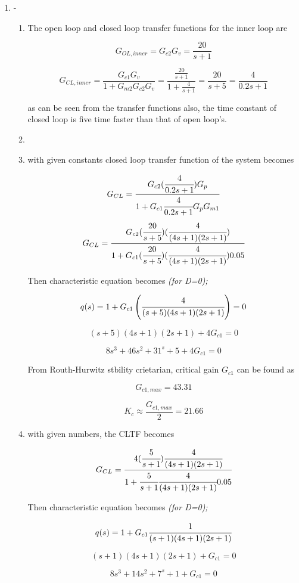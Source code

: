 \documentclass[a4paper,12pt]{article}
\begin{document}
\begin{enumerate}
	\item -
	
		\begin{enumerate}
		
			\item The open loop and closed loop transfer functions for the inner loop are
	
				$$ G_{OL,inner}=G_{c2}G_v=\frac{20}{s+1}$$
		
				$$ G_{CL,inner}=\frac{G_{c1}G_v}{1+G_{m2}G_{c2}G_v}=\frac{\frac{20}{s+1}}{1+\frac{4}{s+1}}=\frac{20}{s+5}=\frac{4}{0.2s+1}$$  
		
				as can be seen from the transfer functions also, the time constant of closed loop is five time faster than that of open loop's.
				
			\item 
			
			
			\item with given constants closed loop transfer function of the system becomes
			
				$$ G_{CL}=\cfrac{G_{c2}(\cfrac{4}{0.2s+1})G_p}{1+G_{c1}\cfrac{4}{0.2s+1}G_pG_{m1}}$$
				$$ G_{CL}= \cfrac{G_{c2}(\cfrac{20}{s+5})(\cfrac{4}{(4s+1)(2s+1)})}{1+G_{c1}(\cfrac{20}{s+5})(\cfrac{4}{(4s+1)(2s+1)})0.05}$$
				
				Then characteristic equation becomes \textit{(for D=0);}
				
				$$ q(s)=1+G_{c1}\left(\cfrac{4}{(s+5)(4s+1)(2s+1)}\right)=0$$
				
				$$ (s+5)(4s+1)(2s+1) +4 G_{c1}=0 $$
				
				$$ 8s^3 + 46s^2 + 31^s + 5 + 4 G_{c1} =0$$
				
				From Routh-Hurwitz stbility crietarian, critical gain $G_{c1}$ can be found as
				
				$$ G_{c1,max}= 43.31 $$
				
				$$\boxed{ K_c \approx \frac{G_{c1,max}}{2}=21.66 }$$
				
				\item with given numbers, the CLTF becomes
				
				$$ G_{CL}=\cfrac{4(\cfrac{5}{s+1})\cfrac{4}{(4s+1)(2s+1)}}{1+\cfrac{5}{s+1}\cfrac{4}{(4s+1)(2s+1)}0.05}$$
				
				Then characteristic equation becomes \textit{(for D=0);}

				$$ 	q(s)= 1+G_{c1}\cfrac{1}{(s+1)(4s+1)(2s+1)} $$
				
				$$ (s+1)(4s+1)(2s+1)+G_{c1}=0$$
				
				$$ 8s^3 + 14s^2 + 7^s + 1 +G_{c1}=0 $$
				

\end{enumerate}
\end{enumerate}
\end{document}
